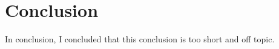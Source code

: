 \chapter{Conclusion}\label{ch:conclusion}
In conclusion, I concluded that this conclusion is too short and off topic.
